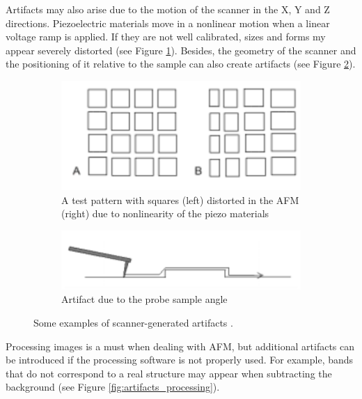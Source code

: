 \documentclass[11pt,a4paper]{article}
\begin{document}
Artifacts may also arise due to the motion of the scanner in the X, Y and Z directions. Piezoelectric materials move in a nonlinear motion when a linear voltage ramp is applied. If they are not well calibrated, sizes and forms my appear severely distorted (see Figure \ref{fig:artifacts_scanner_1}). Besides, the geometry of the scanner and the positioning of it relative to the sample can also create artifacts (see Figure \ref{fig:artifacts_scanner_2}).

\begin{figure}[H]
\centering
\begin{subfigure}[b]{0.45\textwidth}
\includegraphics[width=\textwidth]{artifacts_scanner_1}
\caption{A test pattern with squares (left) distorted in the AFM (right) due to nonlinearity of the piezo materials}
\label{fig:artifacts_scanner_1}
\end{subfigure}
\begin{subfigure}[b]{0.45\textwidth}
\includegraphics[width=\textwidth]{artifacts_scanner_2}
\caption{Artifact due to the probe sample angle}
\label{fig:artifacts_scanner_2}
\end{subfigure}
\caption{Some examples of scanner-generated artifacts \cite{artifacts}.}
\label{fig:artifacts_scanner}
\end{figure}

Processing images is a must when dealing with AFM, but additional artifacts can be introduced if the processing software is not properly used. For example, bands that do not correspond to a real structure may appear when subtracting the background (see Figure \ref{fig:artifacts_processing}).
\end{document}
